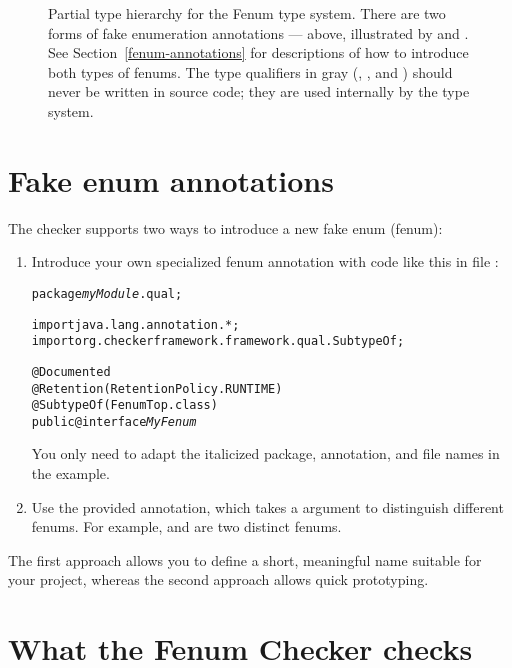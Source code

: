 \begin{figure}
\caption{Partial type hierarchy for the Fenum type system.
There are two forms of fake enumeration annotations --- above, illustrated
by  and .
See Section~\ref{fenum-annotations} for descriptions of how to
introduce both types of fenums. The type qualifiers in gray
(, , and )
should never be written in
source code; they are used internally by the type system.}
\label{fig-fenum-hierarchy}
\end{figure}

\section{Fake enum annotations\label{fenum-annotations}}

The checker supports two ways to introduce a new fake enum (fenum):

\begin{enumerate}
\item Introduce your own specialized fenum annotation with code like this in
file :

\begin{alltt}
package \textit{myModule}.qual;

import java.lang.annotation.*;
import org.checkerframework.framework.qual.SubtypeOf;

@Documented
@Retention(RetentionPolicy.RUNTIME)
@SubtypeOf( \ttlcb{} FenumTop.class \ttrcb{} )
public @interface \textit{MyFenum} \ttlcb\ttrcb
\end{alltt}

You only need to adapt the italicized package, annotation, and file names in the example.


\item Use the provided  annotation, which takes a
 argument to distinguish different fenums.
For example,  and  are two distinct fenums.
\end{enumerate}


The first approach allows you to define a short, meaningful name suitable for
your project, whereas the second approach allows quick prototyping.



\section{What the Fenum Checker checks\label{fenum-checks}}

